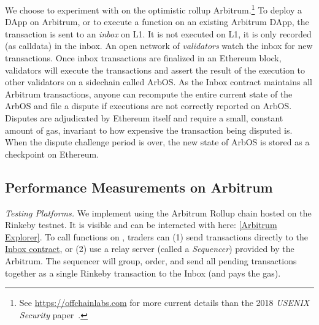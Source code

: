 We choose to experiment with \cm on the optimistic rollup Arbitrum.\footnote{See \url{https://offchainlabs.com} for more current details than the 2018 \textit{USENIX Security} paper~\cite{kalodner2018arbitrum}.} To deploy a DApp on Arbitrum, or to execute a function on an existing Arbitrum DApp, the transaction is sent to an \textit{inbox} on L1. It is not executed on L1, it is only recorded (as calldata) in the inbox. An open network of \textit{validators} watch the inbox for new transactions. Once inbox transactions are finalized in an Ethereum block, validators will execute the transactions and assert the result of the execution to other validators on a sidechain called \textsf{ArbOS}. As the Inbox contract maintains all Arbitrum transactions, anyone can recompute the entire current state of the ArbOS and file a dispute if executions are not correctly reported on ArbOS. Disputes are adjudicated by Ethereum itself and require a small, constant amount of gas, invariant to how expensive the transaction being disputed is. When the dispute challenge period is over, the new state of ArbOS is stored as a checkpoint on Ethereum. 



\subsection{\cm Performance Measurements on Arbitrum}


\textit{Testing Platforms.} We implement \cm using the Arbitrum Rollup chain hosted on the Rinkeby testnet.  It is visible and can be interacted with here: \href{https://rinkeby-explorer.arbitrum.io/address/0x0aa5449a9f7fa34a81ce1dc720563938a27e8b03}{[Arbitrum Explorer]}. To call functions on \cm, traders can (1) send transactions directly to the \href{https://rinkeby.etherscan.io/address/0x578BAde599406A8fE3d24Fd7f7211c0911F5B29e}{Inbox contract}, or (2) use a relay server (called a \textit{Sequencer}) provided by the Arbitrum. The sequencer will group, order, and send all pending transactions together as a single Rinkeby transaction to the Inbox (and pays the gas).

